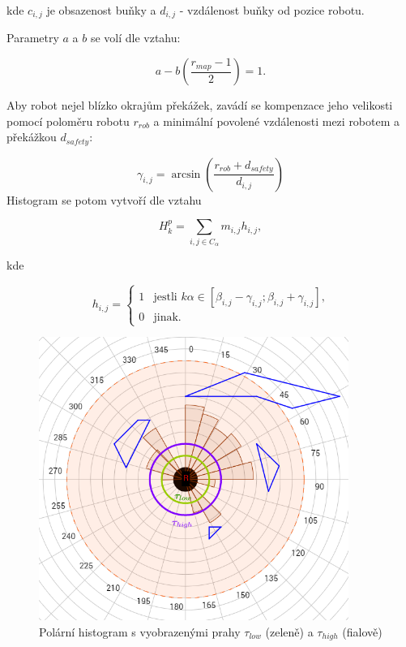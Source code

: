 \documentclass[twoside]{ctuthesis}
\theoremstyle{plain}
\theoremstyle{definition}
\theoremstyle{note}
\begin{document}
kde $c_{i,j}$ je obsazenost buňky a $d_{i,j}$ - vzdálenost buňky od pozice robotu.

Parametry $a$ a $b$ se volí dle vztahu:

\begin{equation}
a - b\left(\frac{r_{map} - 1}{2}\right)   = 1.
\end{equation}


Aby robot nejel blízko okrajům překážek, zavádí se kompenzace jeho velikosti pomocí poloměru robotu $r_{rob}$ a minimální povolené vzdálenosti mezi robotem a překážkou $d_{safety}$:

$$\gamma_{i,j} = \arcsin\left(\frac{r_{rob} + d_{safety}}{d_{i,j}}\right)$$
Histogram se potom vytvoří dle vztahu 

\begin{equation}
H_k^p = \sum_{i,j \in C_{\alpha} } m_{i,j}h_{i,j},
\end{equation}

kde

$$h_{i,j} = \left\{
\begin{array}{ll} 
1&\textrm{jestli $k\alpha \in \left[\beta_{i,j} - \gamma_{i,j}; \beta_{i,j} + \gamma_{i,j}\right]$,} \\ 
0&\textrm{jinak.}
\end{array} 
\right.
$$


\begin{figure}
	\caption{Polární histogram s vyobrazenými prahy $\tau_{low}$ (zeleně) a $\tau_{high}$ (fialově)}
	
	\label{polar}
	\includegraphics[width=0.9\textwidth]{images/3/polar.png}
\end{figure}
\end{document}
